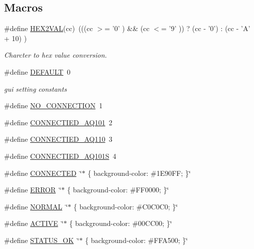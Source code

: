 \subsection*{Macros}
\begin{DoxyCompactItemize}
\item 
\#define \hyperlink{a00090_a428b04d2e2f2da2ea031a6c731660a71}{H\+E\+X2\+V\+A\+L}(cc)~(((cc $>$= '0' ) \&\& (cc $<$= '9' )) ? (cc -\/ '0') \+: (cc -\/ 'A' + 10) )
\begin{DoxyCompactList}\small\item\em Charcter to hex value conversion. \end{DoxyCompactList}\item 
\#define \hyperlink{a00090_a3da44afeba217135a680a7477b5e3ce3}{D\+E\+F\+A\+U\+L\+T}~0
\begin{DoxyCompactList}\small\item\em gui setting constants \end{DoxyCompactList}\item 
\#define \hyperlink{a00090_ae85d2d9036fe89b7201a98b2b3a091d2}{N\+O\+\_\+\+C\+O\+N\+N\+E\+C\+T\+I\+O\+N}~1
\item 
\#define \hyperlink{a00090_ad3f30e8f0d6d166c560d596099924b1e}{C\+O\+N\+N\+E\+C\+T\+I\+E\+D\+\_\+\+A\+Q101}~2
\item 
\#define \hyperlink{a00090_a356c6614536b72807f23fa6b062750f5}{C\+O\+N\+N\+E\+C\+T\+I\+E\+D\+\_\+\+A\+Q110}~3
\item 
\#define \hyperlink{a00090_ae5b15774e72547513ead1cbc9735b68d}{C\+O\+N\+N\+E\+C\+T\+I\+E\+D\+\_\+\+A\+Q101\+S}~4
\item 
\#define \hyperlink{a00090_af6202935c026af12978d46a765dafb90}{C\+O\+N\+N\+E\+C\+T\+E\+D}~\char`\"{}$\ast$ \{ background-\/color\+: \#1\+E90\+F\+F; \}\char`\"{}
\item 
\#define \hyperlink{a00090_a8fe83ac76edc595f6b98cd4a4127aed5}{E\+R\+R\+O\+R}~\char`\"{}$\ast$ \{ background-\/color\+: \#F\+F0000; \}\char`\"{}
\item 
\#define \hyperlink{a00090_a1291f416b069313021b519eea62d5bf1}{N\+O\+R\+M\+A\+L}~\char`\"{}$\ast$ \{ background-\/color\+: \#C0\+C0\+C0; \}\char`\"{}
\item 
\#define \hyperlink{a00090_a3a6d3cd70078e6046471ec528a09cd19}{A\+C\+T\+I\+V\+E}~\char`\"{}$\ast$ \{ background-\/color\+: \#00\+C\+C00; \}\char`\"{}
\item 
\#define \hyperlink{a00090_a2403320c41f08e7567cb169de5db66b3}{S\+T\+A\+T\+U\+S\+\_\+\+O\+K}~\char`\"{}$\ast$ \{ background-\/color\+: \#F\+F\+A500; \}\char`\"{}

\end{DoxyCompactItemize}
